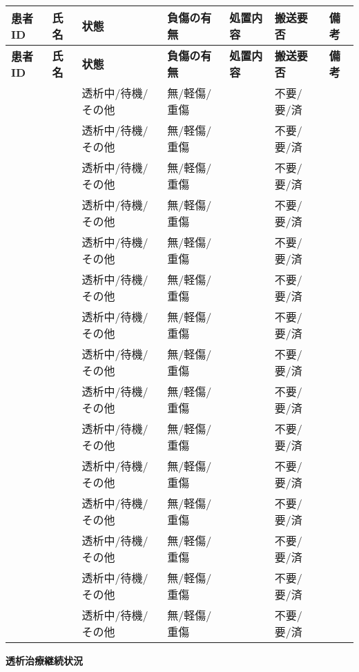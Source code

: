 \documentclass[a4paper,12pt]{jarticle}
\begin{document}
\begin{longtable}{|p{1.8cm}|p{2.2cm}|p{2cm}|p{2cm}|p{2.2cm}|p{1.8cm}|p{2cm}|}
\hline
\textbf{患者ID} & \textbf{氏名} & \textbf{状態} & \textbf{負傷の有無} & \textbf{処置内容} & \textbf{搬送要否} & \textbf{備考} \\
\hline
\endfirsthead

\hline
\textbf{患者ID} & \textbf{氏名} & \textbf{状態} & \textbf{負傷の有無} & \textbf{処置内容} & \textbf{搬送要否} & \textbf{備考} \\
\hline
\endhead

 &  & 透析中/待機/その他 & 無/軽傷/重傷 &  & 不要/要/済 &  \\
\hline
 &  & 透析中/待機/その他 & 無/軽傷/重傷 &  & 不要/要/済 &  \\
\hline
 &  & 透析中/待機/その他 & 無/軽傷/重傷 &  & 不要/要/済 &  \\
\hline
 &  & 透析中/待機/その他 & 無/軽傷/重傷 &  & 不要/要/済 &  \\
\hline
 &  & 透析中/待機/その他 & 無/軽傷/重傷 &  & 不要/要/済 &  \\
\hline
 &  & 透析中/待機/その他 & 無/軽傷/重傷 &  & 不要/要/済 &  \\
\hline
 &  & 透析中/待機/その他 & 無/軽傷/重傷 &  & 不要/要/済 &  \\
\hline
 &  & 透析中/待機/その他 & 無/軽傷/重傷 &  & 不要/要/済 &  \\
\hline
 &  & 透析中/待機/その他 & 無/軽傷/重傷 &  & 不要/要/済 &  \\
\hline
 &  & 透析中/待機/その他 & 無/軽傷/重傷 &  & 不要/要/済 &  \\
\hline
 &  & 透析中/待機/その他 & 無/軽傷/重傷 &  & 不要/要/済 &  \\
\hline
 &  & 透析中/待機/その他 & 無/軽傷/重傷 &  & 不要/要/済 &  \\
\hline
 &  & 透析中/待機/その他 & 無/軽傷/重傷 &  & 不要/要/済 &  \\
\hline
 &  & 透析中/待機/その他 & 無/軽傷/重傷 &  & 不要/要/済 &  \\
\hline
 &  & 透析中/待機/その他 & 無/軽傷/重傷 &  & 不要/要/済 &  \\
\hline
\end{longtable}

\vspace{3mm}

\begin{center}
\textbf{\large 透析治療継続状況}
\end{center}
\end{document}
